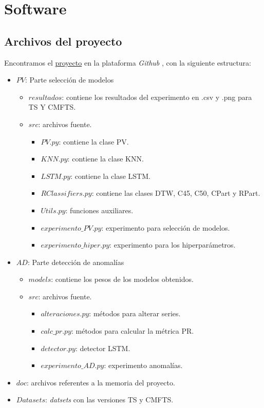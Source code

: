 
\chapter{Software}\label{ap:software}

\section{Archivos del proyecto}

Encontramos el \href{https://github.com/MiguelLentisco/tfg}{proyecto} en la plataforma \emph{Github} , con la siguiente estructura:

\begin{itemize}
  \item $PV$: Parte selección de modelos
    \begin{itemize}
      \item $resultados$: contiene los resultados del experimento en .csv y .png para TS Y CMFTS.
      \item $src$: archivos fuente.
      \begin{itemize}
        \item $PV.py$: contiene la clase PV.
        \item $KNN.py$: contiene la clase KNN.
        \item $LSTM.py$: contiene la clase LSTM.
        \item $RClassifiers.py$: contiene las clases DTW, C45, C50, CPart y RPart.
        \item $Utils.py$: funciones auxiliares.
        \item $experimento\_PV.py$: experimento para selección de modelos.
        \item $experimento\_hiper.py$: experimento para los hiperparámetros.
      \end{itemize}
    \end{itemize}
  \item $AD$: Parte detección de anomalías
    \begin{itemize}
      \item $models$: contiene los pesos de los modelos obtenidos.
      \item $src$: archivos fuente.
        \begin{itemize}
          \item $alteraciones.py$: métodos para alterar series.
          \item $calc\_pr.py$: métodos para calcular la métrica PR.
          \item $detector.py$: detector LSTM.
          \item $experimento\_AD.py$: experimento anomalías.
        \end{itemize}
    \end{itemize}
  \item $doc$: archivos referentes a la memoria del proyecto.
  \item $Datasets$: \emph{datsets} con las versiones TS y CMFTS.

\end{itemize}

